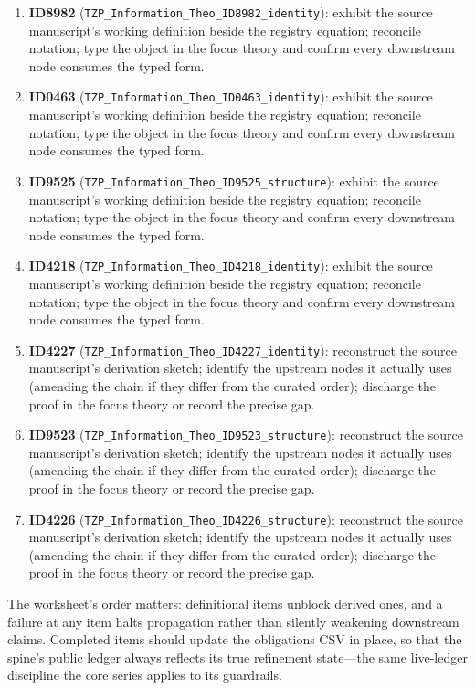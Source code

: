 \documentclass[11pt]{article}
\theoremstyle{remark}
\begin{document}
\begin{enumerate}
\item \textbf{ID8982} (\texttt{TZP\_Information\_Theo\_ID8982\_identity}): exhibit the source manuscript's working definition beside the registry equation; reconcile notation; type the object in the focus theory and confirm every downstream node consumes the typed form.
\item \textbf{ID0463} (\texttt{TZP\_Information\_Theo\_ID0463\_identity}): exhibit the source manuscript's working definition beside the registry equation; reconcile notation; type the object in the focus theory and confirm every downstream node consumes the typed form.
\item \textbf{ID9525} (\texttt{TZP\_Information\_Theo\_ID9525\_structure}): exhibit the source manuscript's working definition beside the registry equation; reconcile notation; type the object in the focus theory and confirm every downstream node consumes the typed form.
\item \textbf{ID4218} (\texttt{TZP\_Information\_Theo\_ID4218\_identity}): exhibit the source manuscript's working definition beside the registry equation; reconcile notation; type the object in the focus theory and confirm every downstream node consumes the typed form.
\item \textbf{ID4227} (\texttt{TZP\_Information\_Theo\_ID4227\_identity}): reconstruct the source manuscript's derivation sketch; identify the upstream nodes it actually uses (amending the chain if they differ from the curated order); discharge the proof in the focus theory or record the precise gap.
\item \textbf{ID9523} (\texttt{TZP\_Information\_Theo\_ID9523\_structure}): reconstruct the source manuscript's derivation sketch; identify the upstream nodes it actually uses (amending the chain if they differ from the curated order); discharge the proof in the focus theory or record the precise gap.
\item \textbf{ID4226} (\texttt{TZP\_Information\_Theo\_ID4226\_structure}): reconstruct the source manuscript's derivation sketch; identify the upstream nodes it actually uses (amending the chain if they differ from the curated order); discharge the proof in the focus theory or record the precise gap.
\end{enumerate}

The worksheet's order matters: definitional items unblock derived ones, and a failure at any item halts propagation rather than silently weakening downstream claims. Completed items should update the obligations CSV in place, so that the spine's public ledger always reflects its true refinement state---the same live-ledger discipline the core series applies to its guardrails.
\end{document}
